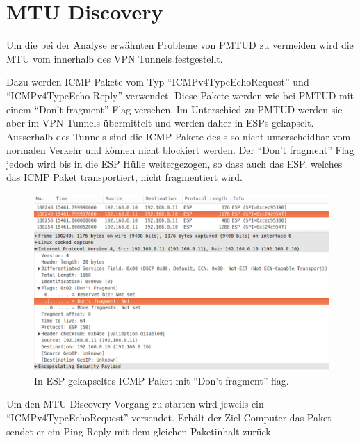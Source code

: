 \cleardoublepage
\section{MTU Discovery}
\label{sec:MTU Discovery}

Um die bei der Analyse erwähnten Probleme von \acs{PMTUD} zu vermeiden wird die \acs{MTU} vom \tool{} innerhalb des \acs{VPN} Tunnels festgestellt.

Dazu werden \acs{ICMP} Pakete vom Typ \enquote{ICMPv4TypeEchoRequest} und \enquote{ICMPv4TypeEcho-Reply} verwendet. Diese Pakete werden wie bei \acs{PMTUD} mit einem \enquote{Don't fragment} Flag versehen. Im Unterschied zu \acs{PMTUD} werden sie aber im \acs{VPN} Tunnels übermittelt und werden daher in \acs{ESP}s gekapselt. Ausserhalb des Tunnels sind die ICMP Pakete des \tool{}s so nicht unterscheidbar vom normalen Verkehr und können nicht blockiert werden.
Der \enquote{Don't fragment} Flag jedoch wird bis in die \acs{ESP} Hülle weitergezogen, so dass auch das \acs{ESP}, welches das \acs{ICMP} Paket transportiert, nicht fragmentiert wird.

\begin{figure}[H]
    \begin{center}
        \includegraphics[trim=1 0 0 0,clip,width=\textwidth]{mainpart/implementation/img/ESP_DontFragment}
    \end{center}
    \caption{In ESP gekapseltes ICMP Paket mit \enquote{Don't fragment} flag.}
\end{figure}

Um den \acs{MTU} Discovery Vorgang zu starten wird jeweils ein \enquote{ICMPv4TypeEchoRequest} versendet. Erhält der Ziel Computer das Paket sendet er ein Ping Reply mit dem gleichen Paketinhalt zurück.

